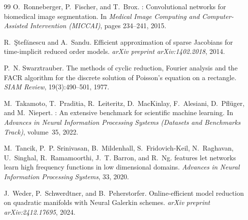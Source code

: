 \begin{thebibliography}{99}
O.~Ronneberger, P.~Fischer, and T.~Brox.
: Convolutional networks for biomedical image segmentation.
\newblock In \emph{Medical Image Computing and Computer-Assisted Intervention
(MICCAI)}, pages 234--241, 2015.

R.~{\c S}tef{\u a}nescu and A.~Sandu.
\newblock Efficient approximation of sparse {Jacobians} for time-implicit
reduced order models.
\newblock \emph{arXiv preprint arXiv:1402.2018}, 2014.

P.~N. Swarztrauber.
\newblock The methods of cyclic reduction, {Fourier} analysis and the {FACR}
algorithm for the discrete solution of {Poisson}'s equation on a rectangle.
\newblock \emph{SIAM Review}, 19(3):490--501, 1977.

M.~Takamoto, T.~Praditia, R.~Leiteritz, D.~MacKinlay, F.~Alesiani,
D.~Pfl{\"u}ger, and M.~Niepert.
: An extensive benchmark for scientific machine learning.
\newblock In \emph{Advances in Neural Information Processing Systems (Datasets
and Benchmarks Track)}, volume~35, 2022.

M.~Tancik, P.~P. Srinivasan, B.~Mildenhall, S.~Fridovich-Keil, N.~Raghavan,
U.~Singhal, R.~Ramamoorthi, J.~T. Barron, and R.~Ng.
 features let networks learn high frequency functions in low
dimensional domains.
\newblock \emph{Advances in Neural Information Processing Systems}, 33, 2020.

J.~Weder, P.~Schwerdtner, and B.~Peherstorfer.
\newblock Online-efficient model reduction on quadratic manifolds with {Neural
Galerkin} schemes.
\newblock \emph{arXiv preprint arXiv:2412.17695}, 2024.

\end{thebibliography}
